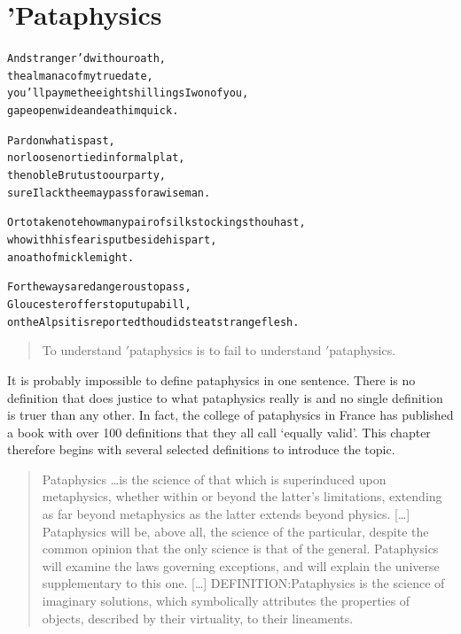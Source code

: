 
\chapter[Pataphysics]{'Pataphysics}
\label{ch:pataphysics}

\startcontents[chapters]

\vfill

\begin{alltt}\sffamily
And stranger'd with our oath,
the almanac of my true date,
you'll pay me the eight shillings I won of you,
gape open wide and eat him quick.

Pardon what is past,
nor loose nor tied in formal plat, 
the noble Brutus to our party,
sure I lack thee may pass for a wise man.

Or to take note how many pair of silk stockings thou hast,
who with his fear is put beside his part,
an oath of mickle might.

For the ways are dangerous to pass,  
Gloucester offers to put up a bill,
on the Alps it is reported thou didst eat strange flesh.
\end{alltt}

\newpage
\minicontents
\spirals

\vspace{1cm}
\begin{figure}[!htbp]
\centering
  \def\svgwidth{\textwidth}\footnotesize
  
\end{figure}

\label{s:definitions}

\begin{quotation}
  To understand $'$pataphysics is to fail to understand $'$pataphysics. 
\end{quotation}

It is probably impossible to define pataphysics in one sentence. There is no definition that does justice to what pataphysics really is and no single definition is truer than any other. In fact, the college of pataphysics in France has published a book \autocite{Brotchie2003} with over 100 definitions that they all call `equally valid'. This chapter therefore begins with several selected definitions to introduce the topic.

\begin{quotation}
  Pataphysics \ldots is the science of that which is superinduced upon metaphysics, whether within or beyond the latter's limitations, extending as far beyond metaphysics as the latter extends beyond physics. [\ldots] Pataphysics will be, above all, the science of the particular, despite the common opinion that the only science is that of the general. Pataphysics will examine the laws governing exceptions, and will explain the universe supplementary to this one. [\ldots] DEFINITION:\@ Pataphysics is the science of imaginary solutions, which symbolically attributes the properties of objects, described by their virtuality, to their lineaments. 
\end{quotation}

